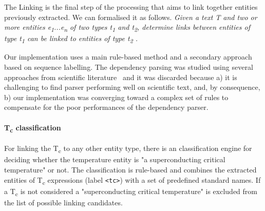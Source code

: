 \documentclass{article}
\begin{document}
The Linking is the final step of the processing that aims to link together entities previously extracted.
We can formalised it as follows. \textit{Given a text T and two or more entities e\textsubscript{1}...e\textsubscript{n} of two types t\textsubscript{1} and t\textsubscript{2}, determine links between entities of type t\textsubscript{1} can be linked to entities of type t\textsubscript{2} .} 

Our implementation uses a main rule-based method and a secondary approach based on sequence labelling. The dependency parsing was studied using several approaches from scientific literature~\cite{yoshikawa:2017acl, Tiktinsky2020pyBARTES, swayamdipta:17, zhou-zhao-2019-head} and it was discarded because a) it is challenging to find parser performing well on scientific text, and, by consequence, b) our implementation was converging toward a complex set of rules to compensate for the poor performances of the dependency parser.

\paragraph{T\textsubscript{c} classification}
For linking the T\textsubscript{c} to any other entity type, there is an classification engine for deciding whether the temperature entity is  "a superconducting critical temperature" or not. 
The classification is rule-based and combines the extracted entities of T\textsubscript{c} expressions (label \texttt{<tc>}) with a set of predefined standard names. 
If a T\textsubscript{c} is not considered a "superconducting critical temperature" is excluded from the list of possible linking candidates. 
\end{document}

